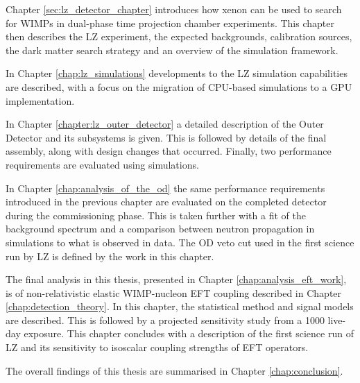 \par
Chapter \ref{sec:lz_detector_chapter} introduces how xenon can be used to search for WIMPs in dual-phase time projection chamber experiments.
This chapter then describes the LZ experiment, the expected backgrounds, calibration sources, the dark matter search strategy and an overview of the simulation framework.

\par
In Chapter \ref{chap:lz_simulations} developments to the LZ simulation capabilities are described, with a focus on the migration of CPU-based simulations to a GPU implementation.

\par
In Chapter \ref{chapter:lz_outer_detector} a detailed description of the Outer Detector and its subsystems is given.
This is followed by details of the final assembly, along with design changes that occurred.
Finally, two performance requirements are evaluated using simulations.

\par
In Chapter \ref{chap:analysis_of_the_od} the same performance requirements introduced in the previous chapter are evaluated on the completed detector during the commissioning phase.
This is taken further with a fit of the background spectrum and a comparison between neutron propagation in simulations to what is observed in data.
The OD veto cut used in the first science run by LZ is defined by the work in this chapter.

\par
The final analysis in this thesis, presented in Chapter \ref{chap:analysis_eft_work}, is of non-relativistic elastic WIMP-nucleon EFT coupling described in Chapter \ref{chap:detection_theory}.
In this chapter, the statistical method and signal models are described.
This is followed by a projected sensitivity study from a 1000 live-day exposure.
This chapter concludes with a description of the first science run of LZ and its sensitivity to isoscalar coupling strengths of EFT operators.

\par
The overall findings of this thesis are summarised in Chapter \ref{chap:conclusion}.
